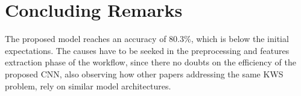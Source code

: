 
\section{Concluding Remarks}
\label{sec:conclusions}


\noindent The proposed model reaches an accuracy of 80.3\%, which is below the initial expectations. The causes have to be seeked in the preprocessing and features extraction phase of the workflow, since there no doubts on the efficiency of the proposed CNN, also observing how other papers addressing the same KWS problem, rely on similar model architectures.
